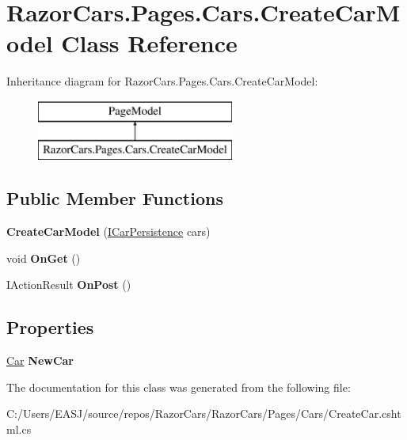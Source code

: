 \hypertarget{class_razor_cars_1_1_pages_1_1_cars_1_1_create_car_model}{}\section{Razor\+Cars.\+Pages.\+Cars.\+Create\+Car\+Model Class Reference}
\label{class_razor_cars_1_1_pages_1_1_cars_1_1_create_car_model}
Inheritance diagram for Razor\+Cars.\+Pages.\+Cars.\+Create\+Car\+Model\+:\begin{figure}[H]
\begin{center}
\leavevmode
\includegraphics[height=2.000000cm]{class_razor_cars_1_1_pages_1_1_cars_1_1_create_car_model}
\end{center}
\end{figure}
\subsection*{Public Member Functions}
\begin{DoxyCompactItemize}
\item 
\mbox{\label{class_razor_cars_1_1_pages_1_1_cars_1_1_create_car_model_a1c8b5a33914864d85bd83686dc2c2415}} 
{\bfseries Create\+Car\+Model} (\mbox{\hyperlink{interface_razor_cars_1_1services_1_1_i_car_persistence}{I\+Car\+Persistence}} cars)
\item 
\mbox{\label{class_razor_cars_1_1_pages_1_1_cars_1_1_create_car_model_af42db1246538177138803315e0f2b5e1}} 
void {\bfseries On\+Get} ()
\item 
\mbox{\label{class_razor_cars_1_1_pages_1_1_cars_1_1_create_car_model_ae1636fe3798e27da15804a749bb363b4}} 
I\+Action\+Result {\bfseries On\+Post} ()
\end{DoxyCompactItemize}
\subsection*{Properties}
\begin{DoxyCompactItemize}
\item 
\mbox{\label{class_razor_cars_1_1_pages_1_1_cars_1_1_create_car_model_a9c499b0d4b064505ff5db8232e2e8e71}} 
\mbox{\hyperlink{class_razor_cars_1_1model_1_1_car}{Car}} {\bfseries New\+Car}
\end{DoxyCompactItemize}


The documentation for this class was generated from the following file\+:\begin{DoxyCompactItemize}
\item 
C\+:/\+Users/\+E\+A\+S\+J/source/repos/\+Razor\+Cars/\+Razor\+Cars/\+Pages/\+Cars/Create\+Car.\+cshtml.\+cs\end{DoxyCompactItemize}
